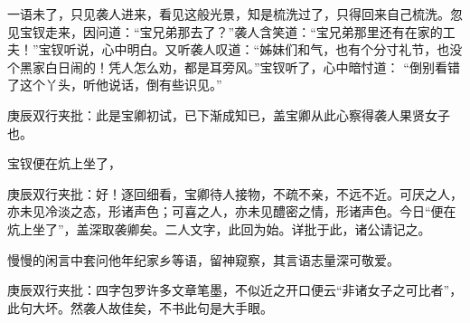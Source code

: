 \begin{parag}
\end{parag}


\begin{parag}
    一语未了，只见袭人进来，看见这般光景，知是梳洗过了，只得回来自己梳洗。忽见宝钗走来，因问道：“宝兄弟那去了？”袭人含笑道：“宝兄弟那里还有在家的工夫！”宝钗听说，心中明白。又听袭人叹道：“姊妹们和气，也有个分寸礼节，也没个黑家白日闹的！凭人怎么劝，都是耳旁风。”宝钗听了，心中暗忖道： “倒别看错了这个丫头，听他说话，倒有些识见。”\begin{note}庚辰双行夹批：此是宝卿初试，已下渐成知已，盖宝卿从此心察得袭人果贤女子也。\end{note}宝钗便在炕上坐了，\begin{note}庚辰双行夹批：好！逐回细看，宝卿待人接物，不疏不亲，不远不近。可厌之人，亦未见冷淡之态，形诸声色；可喜之人，亦未见醴密之情，形诸声色。今日“便在炕上坐了”，盖深取袭卿矣。二人文字，此回为始。详批于此，诸公请记之。\end{note}慢慢的闲言中套问他年纪家乡等语，留神窥察，其言语志量深可敬爱。\begin{note}庚辰双行夹批：四字包罗许多文章笔墨，不似近之开口便云“非诸女子之可比者”，此句大坏。然袭人故佳矣，不书此句是大手眼。\end{note}
\end{parag}


